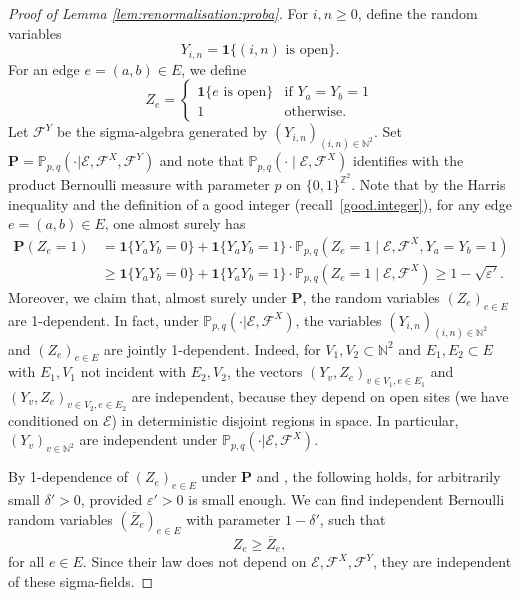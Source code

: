 \documentclass[pdflatex,sn-mathphys-num]{sn-jnl}%
\newcommand{\cE}{\ensuremath{\mathcal E}}
\newcommand{\cF}{\ensuremath{\mathcal F}}
\newcommand{\bbN}{{\ensuremath{\mathbb N}} }
\newcommand{\bbP}{{\ensuremath{\mathbb P}} }
\newcommand{\bbZ}{{\ensuremath{\mathbb Z}} }
\newcommand{\1}{{\ensuremath{\mathbf{1}}} }
\theoremstyle{thmstyleone}%
\theoremstyle{thmstyletwo}%
\theoremstyle{thmstylethree}%
\begin{document}
\begin{proof}[Proof of Lemma \ref{lem:renormalisation:proba}]
For $i,n\ge 0$, define the random variables
\begin{equation}
\label{eq:Yni}Y_{i,n}= \1\{(i,n) \text{ is open}\}.
\end{equation}
For an edge $e=(a,b)\in E$, we define
\begin{equation}\label{def:Ze}
Z_e =
\begin{cases}
\1\{e \text{ is open}\} & \text{if }Y_a=Y_b = 1\\
1 & \text{otherwise.} 
\end{cases}
\end{equation}
Let $\mathcal F^Y$ be the sigma-algebra generated by $(Y_{i,n})_{(i,n)\in\bbN^2}$. Set $\mathbf P=\bbP_{p,q}(\cdot|\cE,\cF^X,\cF^Y)$ and note that $\bbP_{p,q}(\cdot\mid\cE,\cF^X)$ identifies with the product Bernoulli measure with parameter $p$ on $\{0,1\}^{\bbZ^2}$. 
Note that by the Harris inequality and the definition of a good integer (recall~\eqref{good.integer}), for any edge $e=(a,b)\in E$, one almost surely has
\begin{align*}
\mathbf P( Z_e =1)  &{}= \1\{Y_aY_b=0\}+\1\{Y_aY_b=1\}\cdot \bbP_{p,q}(Z_e=1
\mid \cE,\cF^X,Y_a=Y_b=1
)\\
&\ge \1\{Y_aY_b=0\}+\1\{Y_aY_b=1\}\cdot \bbP_{p,q}(Z_e=1
\mid \cE,\cF^X)\ge 1- \sqrt{\varepsilon'}.
\end{align*}
Moreover, we claim that, almost surely under $\mathbf P$, the random variables $(Z_e)_{e\in E}$ are 1-dependent. In fact, 
under $\bbP_{p,q}(\cdot|\cE,\cF^X)$, the variables $(Y_{i,n})_{(i,n)\in\bbN^2}$ and $(Z_e)_{e\in E}$ are jointly 1-dependent. Indeed, for $V_1,V_2\subset \bbN^2$ and $E_1,E_2\subset E$ with $E_1,V_1$ not incident with $E_2,V_2$, the vectors $(Y_v,Z_e)_{v\in V_1,e\in E_1}$ and $(Y_v,Z_e)_{v\in V_2,e\in E_2}$ are independent, because they depend on open sites 
(we have conditioned on $\cE$) in deterministic disjoint regions in space. In particular, $(Y_v)_{v\in\bbN^2}$ are independent under $\bbP_{p,q}(\cdot|\cE,\cF^X)$.

By 1-dependence of $(Z_e)_{e\in E}$ under $\mathbf P$ and \cite[Theorem~0.0]{Liggett97}, the following holds, for arbitrarily small $\delta'>0$, provided $\varepsilon'>0$ is small enough. We can find independent Bernoulli random variables $(\overline Z_e)_{e\in E}$ with parameter $1-\delta'$, such that \begin{equation}
\label{eq:ZZbar}Z_e\ge \overline Z_e,
\end{equation} 
for all $e\in E$. Since their law does not depend on $\cE,\cF^X,\cF^Y$, they are independent of these sigma-fields. 


\end{proof}
\end{document}
